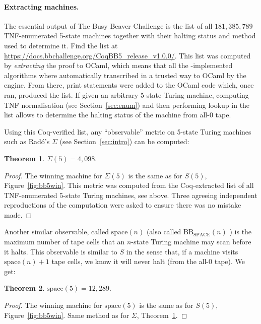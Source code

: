 \documentclass[a4paper,british]{article}
\theoremstyle{definition} %
\newtheorem{theorem}{Theorem}[section]
\numberwithin{equation}{section}
\theoremstyle{definition} %
\newcommand{\BBtheFifthTNF}{181{,}385{,}789}
\newcommand{\rado}{Rad\'o\xspace}
\begin{document}
\paragraph{Extracting machines.} The essential output of The Busy Beaver Challenge is the list of all $\BBtheFifthTNF$ TNF-enumerated 5-state machines together with their halting status and method used to determine it. Find the list at \url{https://docs.bbchallenge.org/CoqBB5_release_v1.0.0/}. This list was computed by \textit{extracting} the \Coq proof to OCaml, which means that all the \Coq-implemented algorithms where automatically transcribed  in a trusted way to OCaml by the \Coq engine. From there, print statements were added to the OCaml code which, once ran, produced the list. If given an arbitrary 5-state Turing machine, computing TNF normalisation (see Section~\ref{sec:enum}) and then performing lookup in the list allows to determine the halting status of the machine from all-0 tape.

Using this Coq-verified list, any ``observable'' metric on 5-state Turing machines such as \rado's $\Sigma$ (see Section~\ref{sec:intro}) can be computed:

\begin{theorem}\label{th:Sigma5}
    $\Sigma(5) = 4{,}098$.
\end{theorem}
\begin{proof}
    The winning machine for $\Sigma(5)$ is the same as for $S(5)$, Figure~\ref{fig:bb5win}.
    This metric was computed from the Coq-extracted list of all TNF-enumerated 5-state Turing machines, see above. Three agreeing independent reproductions of the computation were asked to ensure there was no mistake made.
\end{proof}

Another similar observable, called $\text{space}(n)$ \cite{Ben-Amram1996} (also called $\text{BB}_{\text{SPACE}}(n)$ \cite{sterin_2022_14955828}) is the maximum number of tape cells that an $n$-state Turing machine may scan before it halts. This observable is similar to $S$ in the sense that, if a machine visits $\text{space}(n)+1$ tape cells, we know it will never halt (from the all-0 tape). We get:

\begin{theorem}
    $\text{space}(5) = 12{,}289$.
\end{theorem}
\begin{proof}
    The winning machine for $\text{space}(5)$ is the same as for $S(5)$, Figure~\ref{fig:bb5win}.
    Same method as for $\Sigma$, Theorem~\ref{th:Sigma5}.
\end{proof}
\end{document}
